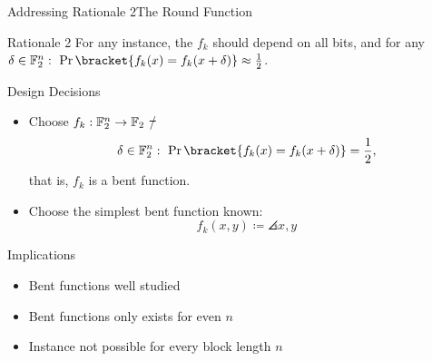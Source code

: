 \begin{frame}{Addressing Rationale 2}{The Round Function}
    \vspace{-60pt}
    \begin{minipage}{0.985\textwidth}
    \begin{exampleblock}{Rationale 2}
        For any instance, the $f_{k}$ should depend on all bits, and for any $\delta \in \F_2^n:\ \Pr\bracket{f_k(x) = f_k(x + \delta)} \approx \frac{1}{2}$.
    \end{exampleblock}
    \end{minipage}

    \begin{minipage}[t][85pt][t]{0.47\textwidth}
        \begin{block}{Design Decisions}
            \begin{itemize}
                \item Choose $f_k : \mathbb{F}_2^n \to \mathbb{F}_2$ \st/
                      \begin{equation*}
                          \delta \in \F_2^n:\ \Pr\bracket{f_k(x) = f_k(x + \delta)} = \frac{1}{2},
                      \end{equation*}
                      that is, $f_k$ is a bent function.
                \item Choose the simplest bent function known:
                    \begin{equation*}
                        f_k(x, y) \coloneqq \angles{x, y}
                    \end{equation*}
            \end{itemize}
        \end{block}
    \end{minipage}
    \hfill
    \begin{minipage}[t][85pt][t]{0.47\textwidth}
        \begin{block}{Implications}
            \begin{itemize}
                \item Bent functions well studied\\[5pt]
                \item Bent functions only exists for even $n$\\[5pt]
                \item Instance not possible for every block length $n$
            \end{itemize}
        \end{block}
    \end{minipage}
\end{frame}

